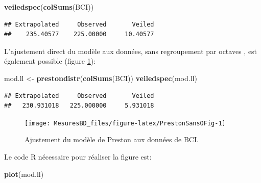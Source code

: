 \documentclass[
  11pt,
  french,
  a4paper,
  extrafontsizes,onecolumn,openright
  ]{memoir}
\newenvironment{Shaded}{\begin{snugshade}}{\end{snugshade}}
\newcommand{\KeywordTok}[1]{\textcolor[rgb]{0.13,0.29,0.53}{\textbf{#1}}}
\newcommand{\NormalTok}[1]{#1}
\newcommand{\StringTok}[1]{\textcolor[rgb]{0.31,0.60,0.02}{#1}}
\begin{document}
\scriptsize

\begin{Shaded}
\begin{Highlighting}[]
\KeywordTok{veiledspec}\NormalTok{(}\KeywordTok{colSums}\NormalTok{(BCI))}
\end{Highlighting}
\end{Shaded}

\begin{verbatim}
## Extrapolated     Observed       Veiled 
##    235.40577    225.00000     10.40577
\end{verbatim}

\normalsize

L'ajustement direct du modèle aux données, sans regroupement par octaves \autocite{Williamson2005}, est également possible (figure \ref{fig:PrestonSansOFig}):

\scriptsize

\begin{Shaded}
\begin{Highlighting}[]
\NormalTok{mod.ll <-}\StringTok{ }\KeywordTok{prestondistr}\NormalTok{(}\KeywordTok{colSums}\NormalTok{(BCI))}
\KeywordTok{veiledspec}\NormalTok{(mod.ll)}
\end{Highlighting}
\end{Shaded}

\begin{verbatim}
## Extrapolated     Observed       Veiled 
##   230.931018   225.000000     5.931018
\end{verbatim}

\normalsize



\scriptsize

\begin{figure}

{\centering \texttt{[image: MesuresBD\_files/figure-latex/PrestonSansOFig-1]} 

}

\caption{Ajustement du modèle de Preston aux données de BCI.}\label{fig:PrestonSansOFig}
\end{figure}

\normalsize

Le code R nécessaire pour réaliser la figure est:

\scriptsize

\begin{Shaded}
\begin{Highlighting}[]
\KeywordTok{plot}\NormalTok{(mod.ll)}
\end{Highlighting}
\end{Shaded}
\end{document}
